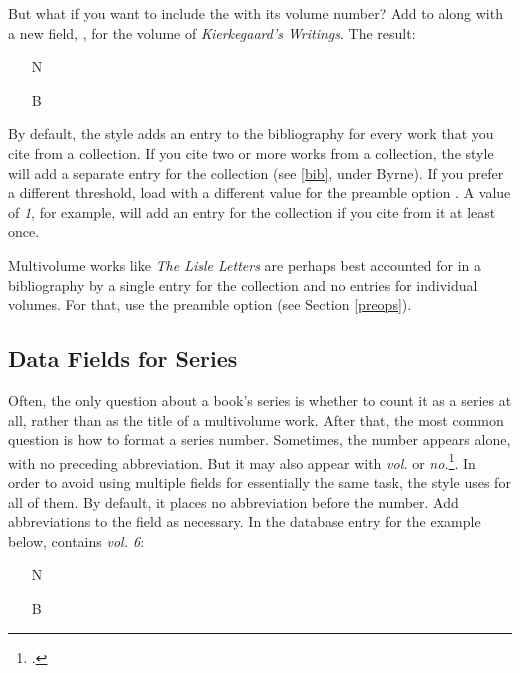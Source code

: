 \documentclass[11pt,letterpaper,oneside]{article}
\begin{document}
But what if you want to include the  with its
volume number? Add  to  along
with a new field, , for the volume of
\textit{Kierkegaard's Writings}. The result:

\begin{itemize}
\item[N] 

\item[B] 
\end{itemize}

By default, the style adds an entry to the bibliography for every work
that you cite from a collection. If you cite two or more works from a
collection, the style will add a separate entry for the collection
(see \ref{bib}, under Byrne). If you prefer a different threshold,
load \biblatex with a different value for the preamble option
. A value of \textit{1}, for example, will add an
entry for the collection if you cite from it at least once.

Multivolume works like \textit{The Lisle Letters} are perhaps best
accounted for in a bibliography by a single entry for the collection
and no entries for individual volumes. For that, use the preamble
option  (see Section \ref{preops}).

\subsection{Data Fields for Series}

Often, the only question about a book's series is whether to count it
as a series at all, rather than as the title of a multivolume work.
After that, the most common question is how to format a series number.
Sometimes, the number appears alone, with no preceding abbreviation.
But it may also appear with \textit{vol.} or
\textit{no.}\footcite[\ref{14.128}. See also \ref{14.130} and
\ref{14.132}.]{chicago2010}. In order to avoid using multiple fields
for essentially the same task, the style uses  for
all of them. By default, it places no abbreviation before the number.
Add abbreviations to the field as necessary. In the database entry for
the example below,  contains \textit{vol. 6}:

\begin{itemize}
\item[N] 

\item[B] 
\end{itemize}
\end{document}
